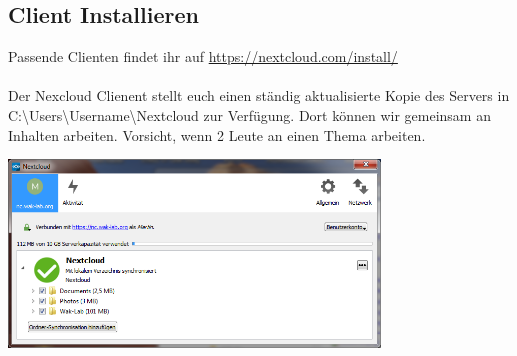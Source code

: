 

\subsection{Client Installieren}
Passende Clienten findet ihr auf \url{https://nextcloud.com/install/}\\
\ \\
Der Nexcloud Clienent stellt euch einen ständig aktualisierte Kopie des Servers in C:\textbackslash Users\textbackslash Username\textbackslash Nextcloud zur Verfügung. Dort können wir gemeinsam an Inhalten arbeiten. Vorsicht, wenn 2 Leute an einen Thema arbeiten.\\
 
\begin{minipage}[t]{\textwidth}
  \centering
  \includegraphics[height=5cm]{pictures/NextcloudWinClient.png}
  \label{img:NextcloudWinClient}
\end{minipage}





